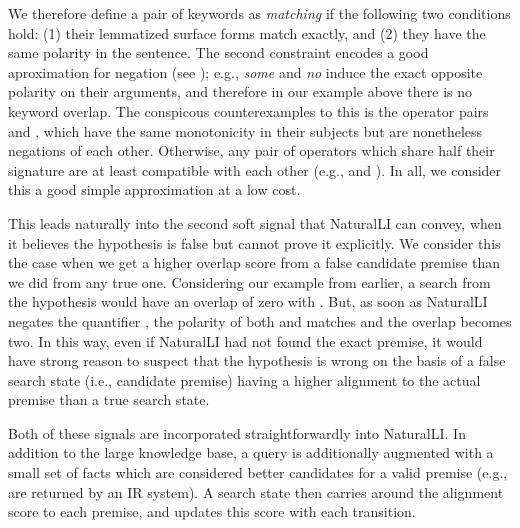 We therefore define a pair of keywords as \textit{matching} if the following two
  conditions hold: 
  (1) their lemmatized surface forms match exactly, and 
  (2) they have the same polarity in the sentence.
The second constraint encodes a good aproximation for negation (see );
  e.g., \textit{some}
  and \textit{no} induce the exact opposite polarity on their arguments,
  and therefore in our example above there is no keyword overlap.
The conspicous counterexamples to this is the operator pairs  and ,
  which have the same monotonicity in their subjects but are nonetheless negations
  of each other.
Otherwise, any pair of operators which share half their signature are at least
  compatible with each other (e.g.,  and ).
In all, we consider this a good simple approximation at a low cost.

This leads naturally into the second soft signal that NaturalLI can convey, when
  it believes the hypothesis is false but cannot prove it explicitly.
We consider this the case when we get a higher overlap score from a false
  candidate premise than we did from any true one.
Considering our example from earlier, a search from the hypothesis
   would have an overlap of zero with .
But, as soon as NaturalLI negates the quantifier , the polarity of both
   and  matches and the overlap becomes two.
In this way, even if NaturalLI had not found the exact premise, it would have
  strong reason to suspect that the hypothesis is wrong on the basis of a
  false search state (i.e., candidate premise) having a higher alignment to 
  the actual premise than a true search state.

Both of these signals are incorporated straightforwardly into NaturalLI.
In addition to the large knowledge base, a query is additionally augmented
  with a small set of facts which are considered better candidates for
  a valid premise (e.g., are returned by an IR system).
A search state then carries around the alignment score to each premise,
  and updates this score with each transition.

